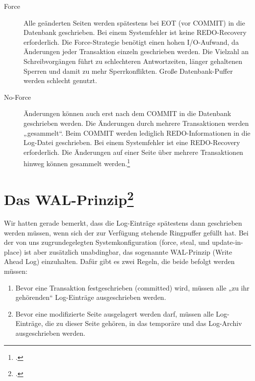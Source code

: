 \documentclass{bschlangaul-theorie}
\begin{document}
\begin{description}

\item [Force]

Alle geänderten Seiten werden spätestens bei EOT (vor COMMIT) in die
Datenbank geschrieben. Bei einem Systemfehler ist keine REDO-Recovery
erforderlich. Die Force-Strategie benötigt einen hohen I/O-Aufwand, da
Änderungen jeder Transaktion einzeln geschrieben werden. Die Vielzahl an
Schreibvorgängen führt zu schlechteren Antwortzeiten, länger gehaltenen
Sperren und damit zu mehr Sperrkonflikten. Große Datenbank-Puffer werden
schlecht genutzt.

\item [No-Force]

Änderungen können auch erst nach dem COMMIT in die Datenbank geschrieben
werden. Die Änderungen durch mehrere Transaktionen werden „gesammelt“.
Beim COMMIT werden lediglich REDO-Informationen in die Log-Datei
geschrieben. Bei einem Systemfehler ist eine REDO-Recovery erforderlich.
Die Änderungen auf einer Seite über mehrere Transaktionen hinweg können
gesammelt werden.\footcite[Seite 25]{db:fs:5}
\end{description}

%

\section{Das WAL-Prinzip\footcite[Kapitel 10.3.5 Seite 318]{kemper}}

Wir hatten gerade bemerkt, dass die Log-Einträge spätestens dann
geschrieben werden müssen, wenn sich der zur Verfügung stehende
Ringpuffer gefüllt hat. Bei der von uns zugrundegelegten
Systemkonfiguration (force, steal, und update-in-place) ist aber
zusätzlich unabdingbar, das sogenannte WAL-Prinzip (Write Ahead Log)
einzuhalten. Dafür gibt es zwei Regeln, die beide befolgt werden müssen:

\begin{enumerate}
\item Bevor eine Transaktion festgeschrieben (committed) wird, müssen
alle „zu ihr gehörenden“ Log-Einträge ausgeschrieben werden.

\item Bevor eine modifizierte Seite ausgelagert werden darf, müssen alle
Log-Einträge, die zu dieser Seite gehören, in das temporäre und das
Log-Archiv ausgeschrieben werden.
\end{enumerate}
\end{document}
